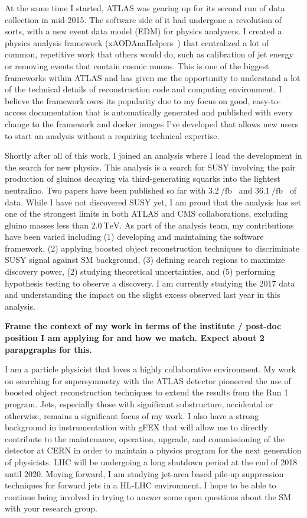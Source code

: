 \documentclass[letterpaper, 10pt]{article}
\begin{document}
At the same time I started, ATLAS was gearing up for its second run of data collection in mid-2015. The software side of it had undergone a revolution of sorts, with a new event data model (EDM) for physics analyzers. I created a physics analysis framework (xAODAnaHelpers~) that centralized a lot of common, repetitive work that others would do, such as calibration of jet energy or removing events that contain cosmic muons. This is one of the biggest frameworks within ATLAS and has given me the opportunity to understand a lot of the technical details of reconstruction code and computing environment. I believe the framework owes its popularity due to my focus on good, easy-to-access documentation that is automatically generated and published with every change to the framework and docker images I've developed that allows new users to start an analysis without a requiring technical expertise.

Shortly after all of this work, I joined an analysis where I lead the development in the search for new physics. This analysis is a search for SUSY involving the pair production of gluinos decaying via third-generating squarks into the lightest neutralino. Two papers have been published so far with $\SI{3.2}{\per\femto\barn}$~ and $\SI{36.1}{\per\femto\barn}$~ of data. While I have not discovered SUSY yet, I am proud that the analysis has set one of the strongest limits in both ATLAS and CMS collaborations, excluding gluino masses less than $\SI{2.0}{\tera\electronvolt}$. As part of the analysis team, my contributions have been varied including (1) developing and maintaining the software framework, (2) applying boosted object reconstruction techniques to discriminate SUSY signal against SM background, (3) defining search regions to maximize discovery power, (2) studying theoretical uncertainties, and (5) performing hypothesis testing to observe a discovery. I am currently studying the 2017 data and understanding the impact on the slight excess observed last year in this analysis.

\textbf{Frame the context of my work in terms of the institute / post-doc position I am applying for and how we match. Expect about 2 parapgraphs for this.}

I am a particle physicist that loves a highly collaborative environment. My work on searching for supersymmetry with the ATLAS detector pioneered the use of boosted object reconstruction techniques to extend the results from the Run 1 program. Jets, especially those with significant substructure, accidental or otherwise, remains a significant focus of my work. I also have a strong background in instrumentation with gFEX that will allow me to directly contribute to the maintenance, operation, upgrade, and commissioning of the detector at CERN in order to maintain a physics program for the next generation of physicists. LHC will be undergoing a long shutdown period at the end of 2018 until 2020. Moving forward, I am studying jet-area based pile-up suppression techniques for forward jets in a HL-LHC environment. I hope to be able to continue being involved in trying to answer some open questions about the SM with your research group.
\end{document}
